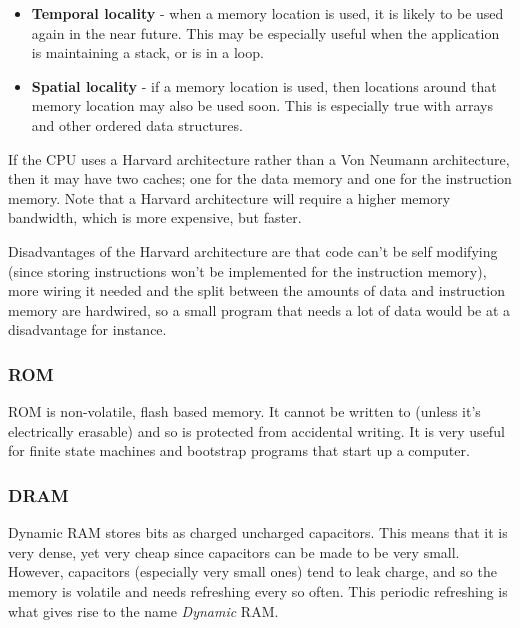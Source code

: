 \begin{itemize}
	\item {\bf Temporal locality} - when a memory location is used, it is likely
	to be used again in the near future. This may be especially useful when the
	application is maintaining a stack, or is in a loop.
	\item {\bf Spatial locality} - if a memory location is used, then locations
	around that memory location may also be used soon. This is especially true
	with arrays and other ordered data structures.
\end{itemize}

If the CPU uses a Harvard architecture rather than a Von Neumann architecture,
then it may have two caches; one for the data memory and one for the instruction
memory. Note that a Harvard architecture will require a higher memory bandwidth,
which is more expensive, but faster.

Disadvantages of the Harvard architecture are that code can't be self modifying
(since storing instructions won't be implemented for the instruction memory),
more wiring it needed and the split between the amounts of data and instruction
memory are hardwired, so a small program that needs a lot of data would be at a
disadvantage for instance.

\subsubsection{ROM}

ROM is non-volatile, flash based memory. It cannot be written to (unless it's
electrically erasable) and so is protected from accidental writing. It is very
useful for finite state machines and bootstrap programs that start up a
computer.

\subsubsection{DRAM}

Dynamic RAM stores bits as charged uncharged capacitors. This means that it is
very dense, yet very cheap since capacitors can be made to be very small.
However, capacitors (especially very small ones) tend to leak charge, and so the
memory is volatile and needs refreshing every so often. This periodic refreshing
is what gives rise to the name {\it Dynamic} RAM.
